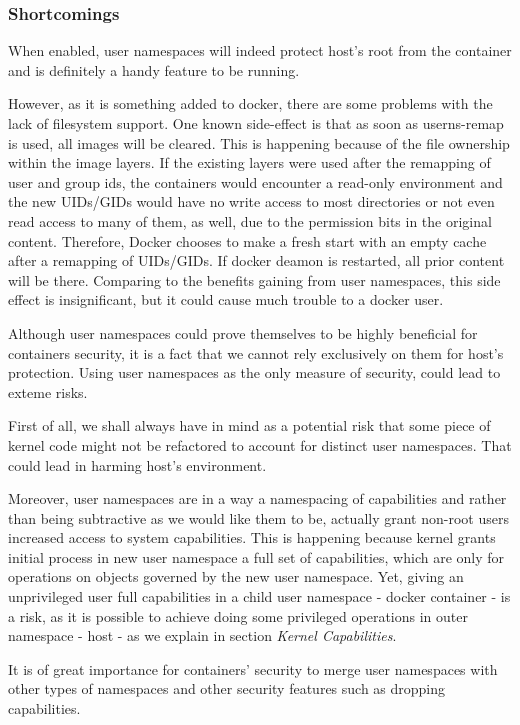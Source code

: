 \subsubsection{Shortcomings}
When enabled, user namespaces will indeed protect host's root from the container and is definitely a handy feature to be running.

However, as it is something  added to docker, there are some problems with the lack of filesystem support. One known side-effect is that as soon as userns-remap is used, all images will be cleared. This is happening because of the file ownership within the image layers. If the existing layers were used after the remapping of user and group ids, the containers would encounter a read-only environment and the new UIDs/GIDs would have no write access to most directories or not even read access to many of them, as well, due to the permission bits in the original content. Therefore, Docker chooses to make a fresh start with an empty cache after a remapping of UIDs/GIDs. If docker deamon is restarted, all prior content will be there. Comparing to the benefits gaining from user namespaces, this side effect is insignificant, but it could cause much trouble to a docker user.

Although user namespaces could prove themselves to be highly beneficial for containers security, it is a fact that we cannot rely exclusively on them for host's protection. Using user namespaces as the only measure of security, could lead to exteme risks.

First of all, we shall always have in mind as a potential risk that some piece of kernel code might not be refactored to account for distinct user namespaces. That could lead in harming host's environment.

Moreover, user namespaces are in a way a namespacing of capabilities and rather than being subtractive as we would like them to be, actually grant non-root users increased access to system capabilities. This is happening because kernel grants initial process in new user namespace a full set of capabilities, which are only for operations on objects governed by the new user namespace. Yet, giving an unprivileged user full capabilities in a child user namespace - docker container - is a risk, as it is possible to achieve doing some privileged operations in outer namespace - host - as we explain in section \textit{Kernel Capabilities}. \cite{usernsnotsosecure}

It is of great importance for containers' security to merge user namespaces with other types of namespaces and other security features such as dropping capabilities.

